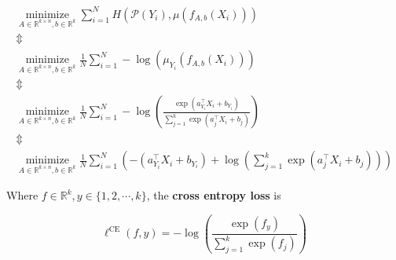 \begin{concept}
    $$
    \begin{gathered}
    \underset{A \in \mathbb{R}^{k \times n}, b \in \mathbb{R}^{k}}{\operatorname{minimize}} \sum_{i=1}^{N} H\left(\mathcal{P}\left(Y_{i}\right), \mu\left(f_{A, b}\left(X_{i}\right)\right)\right) \\
    \mathbb{\Updownarrow} \\
    \underset{A \in \mathbb{R}^{k \times n}, b \in \mathbb{R}^{k}}{\operatorname{minimize}} \frac{1}{N} \sum_{i=1}^{N}-\log \left(\mu_{Y_{i}}\left(f_{A, b}\left(X_{i}\right)\right)\right) \\
    \mathbb{\Updownarrow} \\
    \underset{A \in \mathbb{R}^{k \times n}, b \in \mathbb{R}^{k}}{\operatorname{minimize}} \frac{1}{N} \sum_{i=1}^{N}-\log \left(\frac{\exp \left(a_{Y_{i}}^{\top} X_{i}+b_{Y_{i}}\right)}{\sum_{j=1}^{k} \exp \left(a_{j}^{\top} X_{i}+b_{j}\right)}\right) \\
    \mathbb{\Updownarrow} \\
    \underset{A \in \mathbb{R}^{k \times n}, b \in \mathbb{R}^{k}}{\operatorname{minimize}} \frac{1}{N} \sum_{i=1}^{N}\left(-\left(a_{Y_{i}}^{\top} X_{i}+b_{Y_{i}}\right)+\log \left(\sum_{j=1}^{k} \exp \left(a_{j}^{\top} X_{i}+b_{j}\right)\right)\right)
    \end{gathered}
    $$
\end{concept}

\begin{definition}
    Where $f \in \mathbb{R}^{k}, y \in \{1, 2, \cdots, k\}$, the \textbf{cross entropy loss} is

    $$
    \ell^{\mathrm{CE}}(f, y)=-\log \left(\frac{\exp \left(f_{y}\right)}{\sum_{j=1}^{k} \exp \left(f_{j}\right)}\right)
    $$
\end{definition}

